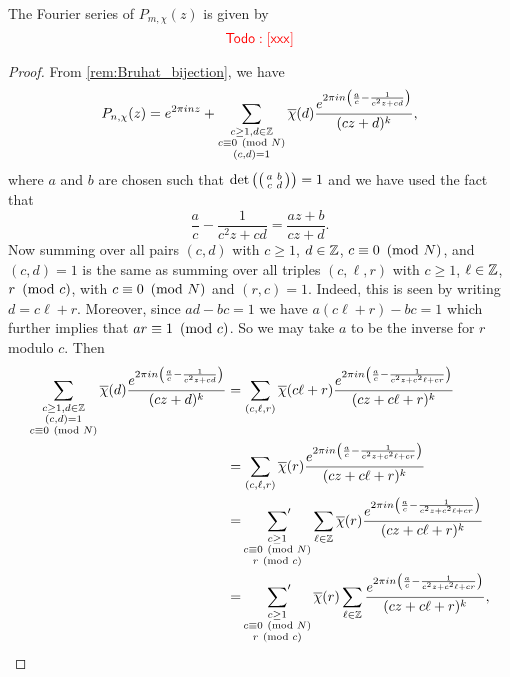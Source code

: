     \begin{theorem}
      The Fourier series of $P_{m,\chi}(z)$ is given by
      \[
        \textcolor{red}{\sf Todo: [xxx]}
      \]
    \end{theorem}
    \begin{proof}
      From \cref{rem:Bruhat_bijection}, we have
      \[
        P_{n,\chi}(z) = e^{2\pi inz}+\sum_{\substack{c \ge 1, d \in \mathbb{Z} \\ c \equiv 0 \ \left(\text{mod }N\right) \\ (c,d) = 1}}\overline{\chi}(d)\frac{e^{2\pi in\left(\frac{a}{c}-\frac{1}{c^{2}z+cd}\right)}}{(cz+d)^{k}},
      \]
      where $a$ and $b$ are chosen such that $\det\left(\begin{psmallmatrix} a & b \\ c & d \end{psmallmatrix}\right) = 1$ and we have used the fact that
      \[
        \frac{a}{c}-\frac{1}{c^{2}z+cd} = \frac{az+b}{cz+d}.
      \]
      Now summing over all pairs $(c,d)$ with $c \ge 1$, $d \in \mathbb{Z}$, $c \equiv 0 \ \left(\text{mod }N\right)$, and $(c,d) = 1$ is the same as summing over all triples $(c,\ell,r)$ with $c \ge 1$, $\ell \in \mathbb{Z}$, $r \ \left(\text{mod }c\right)$, with $c \equiv 0 \ \left(\text{mod }N\right)$ and $(r,c) = 1$. Indeed, this is seen by writing $d = c\ell+r$. Moreover, since $ad-bc = 1$ we have $a(c\ell+r)-bc = 1$ which further implies that $ar \equiv 1 \ \left(\text{mod }c\right)$. So we may take $a$ to be the inverse for $r$ modulo $c$. Then
      \begin{align*}
        \sum_{\substack{c \ge 1,d \in \Z \\ (c,d) = 1 \\ c \equiv 0 \tmod{N}}}\cchi(d)\frac{e^{2\pi in\left(\frac{a}{c}-\frac{1}{c^{2}z+cd}\right)}}{(cz+d)^{k}} &= \sum_{(c,\ell,r)}\cchi(c\ell+r)\frac{e^{2\pi in\left(\frac{a}{c}-\frac{1}{c^{2}z+c^{2}\ell+cr}\right)}}{(cz+c\ell+r)^{k}} \\
        &= \sum_{(c,\ell,r)}\cchi(r)\frac{e^{2\pi in\left(\frac{a}{c}-\frac{1}{c^{2}z+c^{2}\ell+cr}\right)}}{(cz+c\ell+r)^{k}} \\
        &= \psum_{\substack{c \ge 1 \\ c \equiv 0 \tmod{N} \\ r \tmod{c}}}\sum_{\ell \in \Z}\cchi(r)\frac{e^{2\pi in\left(\frac{a}{c}-\frac{1}{c^{2}z+c^{2}\ell+cr}\right)}}{(cz+c\ell+r)^{k}} \\
        &= \psum_{\substack{c \ge 1 \\ c \equiv 0 \tmod{N} \\ r \tmod{c}}}\cchi(r)\sum_{\ell \in \Z}\frac{e^{2\pi in\left(\frac{a}{c}-\frac{1}{c^{2}z+c^{2}\ell+cr}\right)}}{(cz+c\ell+r)^{k}},

\end{align*}
\end{proof}
